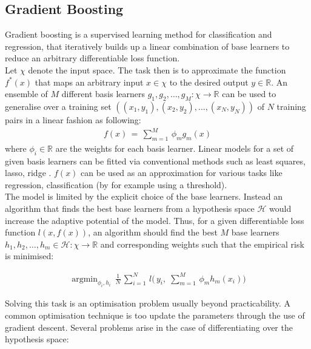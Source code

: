 \documentclass[a4paper, 11pt]{article}
\DeclareMathOperator*{\argmin}{argmin} %
\begin{document}
\subsection{Gradient Boosting}
Gradient boosting is a supervised learning method for classification and regression, that iteratively builds up a linear combination of base learners to reduce an arbitrary differentiable loss function.\\

Let $\chi$ denote the input space. The task then is to approximate the function $f^*(x)$ that maps an arbitrary input $x \in \chi$ to the desired output $y \in \mathbb{R}$. An ensemble of $M$ different basis learners $g_1,g_2,\ldots,g_M: \chi \rightarrow \mathbb{R}$ can be used to generalise over a training set $((x_1, y_1),(x_2,y_2),\ldots,(x_N, y_N))$ of $N$ training pairs in a linear fashion as following:
\begin{align*}
f(x)\, =\, \sum_{m=1}^{M}\, \phi_m g_m(x)
\end{align*}
where $\phi_i \in \mathbb{R}$ are the weights for each basis learner. Linear models for a set of given basis learners can be fitted via conventional methods such as least squares, lasso, ridge \parencite{bishop2006pattern}. $f(x)$ can be used as an approximation for various tasks like regression, classification (by for example using a threshold).\\

The model is limited by the explicit choice of the base learners. Instead an algorithm that finds the best base learners from a hypothesis space $\mathcal{H}$ would increase the adaptive potential of the model. Thus, for a given differentiable loss function $l(x, f(x))$, an algorithm should find the best $M$ base learners $h_1, h_2, \ldots, h_m \in \mathcal{H}: \chi \rightarrow \mathbb{R}$ and corresponding weights such that the empirical risk is minimised:

\begin{align*}
\argmin_{\phi_i, h_i}\, \frac{1}{N}\, \sum_{i = 1}^{N}\, l\big(\, y_i,\; \sum_{m=1}^{M}\, \phi_m h_m(x_i)\big)
\end{align*}

Solving this task is an optimisation problem usually beyond practicability. A common optimisation technique is too update the parameters through the use of gradient descent. Several problems arise in the case of differentiating over the hypothesis space:
\end{document}

